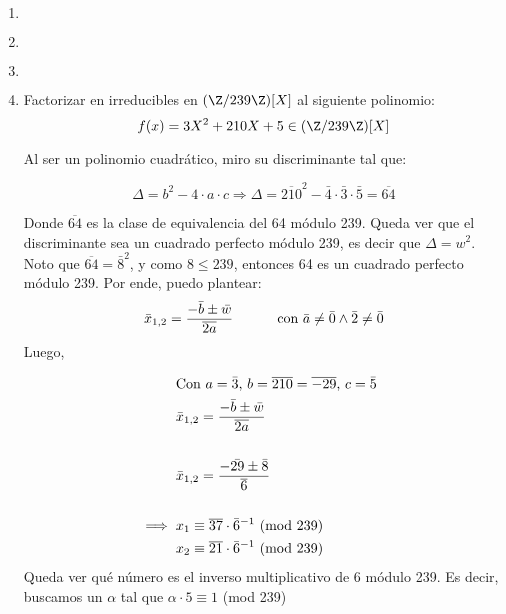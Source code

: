 \documentclass[../main.tex]{subfiles}
\begin{document}
{\begin{enumerate}
\end{enumerate}

\newpage

\begin{enumerate}
    \item $ $
    \item $ $
    \item $ $
    \item { Factorizar en irreducibles en $(\Z / 239 \Z)[X]$ al siguiente polinomio:
        \begin{equation*}
            f(x) = 3X^2 + 210X + 5 \in (\Z / 239 \Z)[X]
        \end{equation*}
        
        Al ser un polinomio cuadrático, miro su discriminante tal que:
        
        \begin{equation*}
            \Delta = b^2 - 4 \cdot a \cdot c \Longrightarrow \Delta = \overline{210}^2 - \bar{4} \cdot \bar{3} \cdot \bar{5} = \overline{64}
        \end{equation*}
        
        Donde $\overline{64}$ es la clase de equivalencia del 64 módulo 239.
        \nln
        Queda ver que el discriminante sea un cuadrado perfecto módulo 239, es decir que $\Delta = w^2$. Noto que $\overline{64} = \bar{8}^2$, y como $8 \leq 239$, entonces 64 es un cuadrado perfecto módulo 239.
        \nln
        Por ende, puedo plantear:
        \begin{equation*}
            \bar{x}_{1,2} = \frac{-\bar{b} \pm \bar{w}}{\overline{2a}} \hspace{10mm}\text{   con $\bar{a} \neq \bar{0} \land \bar{2} \neq \bar{0}$}
        \end{equation*}
        \nln
        Luego,
        
        \begin{align*}
            & \text{Con $a = \bar{3}$, $b = \overline{210} = \overline{-29}$, $c = \bar{5}$ } \\
            & \bar{x}_{1,2} = \frac{-\bar{b} \pm \bar{w}}{\overline{2a}} \\\\
            & \bar{x}_{1,2} = \frac{-\bar{29} \pm \bar{8}}{\overline{6}} \\\\
            \Longrightarrow \hspace{2mm} & x_1 \equiv \overline{37} \cdot {\bar{6}}^{-1} \text{ (mod 239)} \\
            & x_2 \equiv \overline{21} \cdot {\bar{6}}^{-1} \text{ (mod 239)} \\
        \end{align*}
        \nln
        Queda ver qué número es el inverso multiplicativo de 6 módulo 239. Es decir, buscamos un $\alpha$ tal que $\alpha \cdot 5 \equiv 1$ (mod 239)
        
}
\end{enumerate}}
\end{document}
